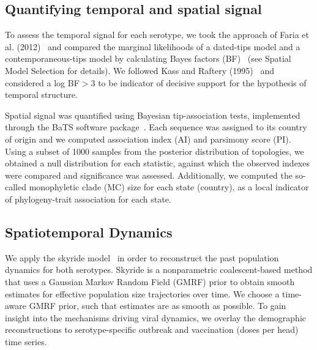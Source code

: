 \documentclass[10pt]{article}
\begin{document}
\subsection*{Quantifying temporal and spatial signal} 

To assess the temporal signal for each serotype, we took the approach of Faria et al. (2012)~\cite{Faria2012} and compared the marginal likelihoods of a dated-tips model and a contemporaneous-tips model by calculating Bayes factors (BF)~\cite{Suchard2001, suchard2005models} (see Spatial Model Selection for details).
We followed Kass and Raftery (1995)~\cite{KassRaftery1995} and considered a log BF$>$3 to be indicator of decisive support for the hypothesis of temporal structure.

Spatial signal was quantified using Bayesian tip-association tests, implemented through the BaTS software package~\cite{bats}.
Each sequence was assigned to its country of origin and we computed association index (AI) and parsimony score (PI).
Using a subset of 1000 samples from the posterior distribution of topologies, we obtained a null distribution for each statistic, against which the observed indexes were compared and significance was assessed.
Additionally, we computed the so-called monophyletic clade (MC) size for each state (country), as a local indicator of phylogeny-trait association for each state.


\subsection*{Spatiotemporal Dynamics}
We apply the 
skyride model~\cite{skyride} in order to reconstruct the past population dynamics for both serotypes.
Skyride is a nonparametric coalescent-based method that uses a Gaussian Markov Random Field (GMRF) prior to obtain smooth estimates for effective population size trajectories over time.
We choose a time-aware GMRF prior, such that estimates are as smooth as possible.
To gain insight into the mechanisms driving viral dynamics, we overlay the demographic reconstructions to serotype-specific outbreak and vaccination (doses per head) time series.
\end{document}
